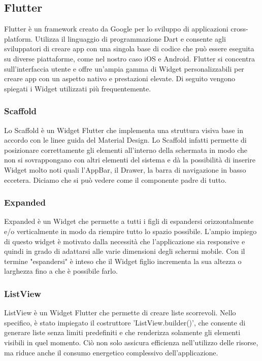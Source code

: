 \subsection{Flutter} \label{sub:flutter}
Flutter \cite{flutter} è un framework creato da Google per lo sviluppo di applicazioni cross-platform. Utilizza il linguaggio di programmazione Dart e consente agli sviluppatori di creare app con una singola base di codice che può essere eseguita su diverse piattaforme, come nel nostro caso iOS e Android. Flutter si concentra sull'interfaccia utente e offre un'ampia gamma di Widget \cite{widget} personalizzabili per creare app con un aspetto nativo e prestazioni elevate. Di seguito vengono spiegati i Widget utilizzati più frequentemente.

\subsubsection{Scaffold} \label{subsub:scaffold}
Lo Scaffold \cite{scaffold} è un Widget Flutter che implementa una struttura visiva base in accordo con le linee guida del Material Design. Lo Scaffold infatti permette di posizionare correttamente gli elementi all'interno della schermata in modo che non si sovrappongano con altri elementi del sistema e dà la possibilità di inserire Widget molto noti quali l'AppBar, il Drawer, la barra di navigazione in basso eccetera. Diciamo che si può vedere come il componente padre di tutto.

\subsubsection{Expanded} \label{subsub:expanded}
Expanded \cite{expanded} è un Widget che permette a tutti i figli di espandersi orizzontalmente e/o verticalmente in modo da riempire tutto lo spazio possibile. L'ampio impiego di questo widget è motivato dalla necessità che l'applicazione sia responsive e quindi in grado di adattarsi alle varie dimensioni degli schermi mobile. Con il termine "espandersi" è inteso che il Widget figlio incrementa la sua altezza o larghezza fino a che è possibile farlo.

\subsubsection{ListView}
ListView \cite{listview} è un Widget Flutter che permette di creare liste scorrevoli. Nello specifico, è stato impiegato il costruttore 'ListView.builder()', che consente di generare liste senza limiti predefiniti e che renderizza solamente gli elementi visibili in quel momento. Ciò non solo assicura efficienza nell'utilizzo delle risorse, ma riduce anche il consumo energetico complessivo dell'applicazione.

